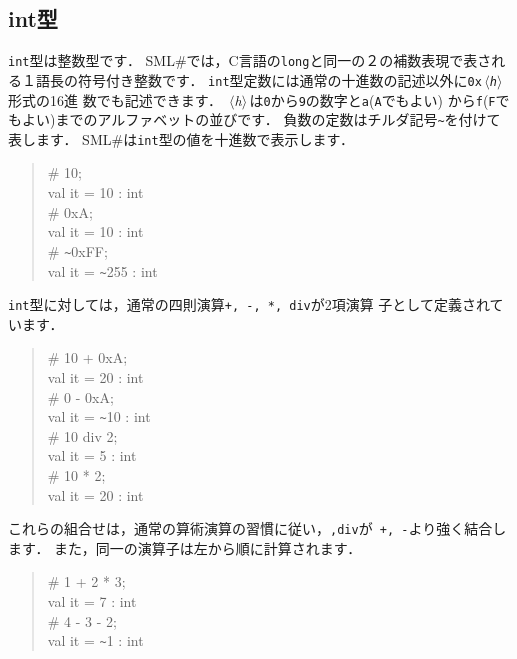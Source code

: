 \documentclass{jbook}
\newcommand{\smlsharp}{SML\#}
\newcommand{\code}[1]{\mbox{\large\tt #1}}
\newcommand{\nonterm}[1]{\mbox{$\,\langle$}{\it #1}\mbox{$\rangle\,$}}
\newenvironment{program}{\begin{quote}\begin{tt}}%
                        {\end{tt}\end{quote}}
\begin{document}
\subsection{int型}
	{\tt int}型は整数型です．
	\smlsharp{}では，C言語の\code{long}と同一の２の補数表現で表され
る１語長の符号付き整数です．
	{\tt int}型定数には通常の十進数の記述以外に{\tt 0x\nonterm{h}}形式の16進
数でも記述できます．
	\nonterm{h}は{\tt 0}から{\tt 9}の数字と{\tt a}({\tt A}でもよい)
から{\tt f}({\tt F}でもよい)までのアルファベットの並びです．
	負数の定数はチルダ記号\verb|~|を付けて表します．
	\smlsharp{}は{\tt int}型の値を十進数で表示します．
\begin{program}
\# 10;\\
val it = 10 : int\\
\# 0xA;\\
val it = 10 : int\\
\# \verb|~|0xFF;\\
val it = \verb|~|255 : int
\end{program}
	{\tt int}型に対しては，通常の四則演算{\tt +, -, *, div}が2項演算
子として定義されています．
\begin{program}
\# 10 + 0xA;\\
val it = 20 : int\\
\# 0 - 0xA;\\
val it = \verb|~|10 : int\\
\# 10 div 2;\\
val it = 5 : int\\
\# 10 * 2;\\
val it = 20 : int
\end{program}
	これらの組合せは，通常の算術演算の習慣に従い，{\tt *,div}が{\tt
+, -}より強く結合します．
	また，同一の演算子は左から順に計算されます．
\begin{program}
\# 1 + 2 * 3;\\
val it = 7 : int\\
\# 4 - 3 - 2;\\
val it = \verb|~|1 : int
\end{program}
\end{document}
